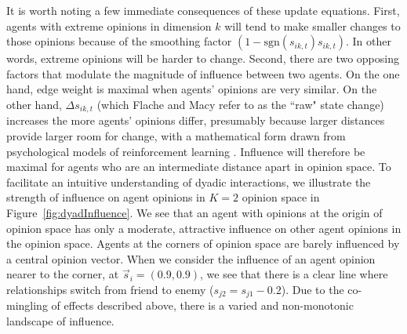 It is worth noting a few immediate consequences of these update equations.  
First, agents with extreme opinions in %
dimension $k$ will 
tend to make smaller changes to those opinions
because of the smoothing factor $(1 - \text{sgn}(s_{ik,t})s_{ik,t})$. In other words, extreme opinions will be harder to change. 
Second, there are two opposing factors that modulate the magnitude of 
influence between two agents. On the one hand, edge weight is maximal when agents' opinions are very similar. 
On the other hand, $\Delta s_{ik,t}$ (which Flache and Macy refer to as the ``raw" state change) increases the more agents' opinions differ, presumably because larger distances provide larger room for change, with a mathematical form drawn from psychological models of reinforcement learning \cite{rescorlaw72,sutton1998reinforcement}. Influence will therefore be maximal for agents who are an intermediate distance apart in opinion space. 
To facilitate an intuitive understanding of dyadic interactions, we illustrate the strength of influence on
agent opinions in $K=2$ opinion space 
\noautomath
in Figure~\ref{fig:dyadInfluence}. 
We see that an agent with opinions at the origin of opinion space has only 
a moderate, attractive influence on other agent opinions in the opinion space.
Agents at the corners of opinion space are barely influenced by a central 
opinion vector. When we consider the influence of an agent opinion nearer
to the corner, at $\vec s_i = (0.9, 0.9)$, we see that there is a clear
line where relationships switch from friend to enemy ($s_{j2} = s_{j1} - 0.2$). 
Due to the co-mingling of effects described above, 
there is a varied and non-monotonic landscape of influence.

